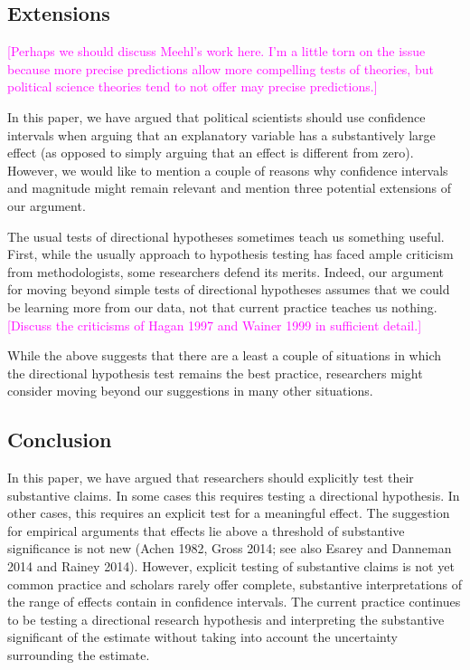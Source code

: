 \documentclass[12pt]{article}
\newcommand{\carlisle}[1]{\textcolor{magenta}{#1}}
\begin{document}
\subsection*{Extensions}

\carlisle{[Perhaps we should discuss Meehl's work here. I'm a little torn on the issue because more precise predictions allow more compelling tests of theories, but political science theories tend to not offer may precise predictions.]}

In this paper, we have argued that political scientists should use confidence intervals when arguing that an explanatory variable has a substantively large effect (as opposed to simply arguing that an effect is different from zero). However, we would like to mention a couple of reasons why confidence intervals and magnitude might remain relevant and mention three potential extensions of our argument.

The usual tests of directional hypotheses sometimes teach us something useful. First, while the usually approach to hypothesis testing has faced ample criticism from methodologists, some researchers defend its merits. Indeed, our argument for moving beyond simple tests of directional hypotheses assumes that we could be learning more from our data, not that current practice teaches us nothing. \carlisle{[Discuss the criticisms of Hagan 1997 and Wainer 1999 in sufficient detail.]}


While the above suggests that there are a least a couple of situations in which the directional hypothesis test remains the best practice, researchers might consider moving beyond our suggestions in many other situations. 


\subsection*{Conclusion}

In this paper, we have argued that researchers should explicitly test their substantive claims. In some cases this requires testing a directional hypothesis. In other cases, this requires an explicit test for a meaningful effect. The suggestion for empirical arguments that effects lie above a threshold of substantive significance is not new (Achen 1982, Gross 2014; see also Esarey and Danneman 2014 and Rainey 2014). However, explicit testing of substantive claims is not yet common practice and scholars rarely offer complete, substantive interpretations of the range of effects contain in confidence intervals. The current practice continues to be testing a directional research hypothesis and interpreting the substantive significant of the estimate without taking into account the uncertainty surrounding the estimate. 
\end{document}
